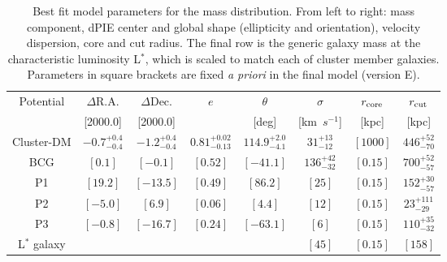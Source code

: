 \documentclass[12pt,dvipsnames]{article}
\begin{document}
\begin{table}[]
    \centering
    \begin{tabular}{c|c|c|c|c|c|c|c|}
    Potential & $\Delta$R.A. & $\Delta$Dec. & $e$ & $\theta$ & $\sigma$ & $r_{\rm core}$ & $r_{\rm cut}$ \\
    & [2000.0] & [2000.0] & & [deg] & [km\ $s^{-1}$] & [kpc] & [kpc] \\
\hline
Cluster-DM & $ -0.7^{+  0.4}_{ -0.4}$ & $ -1.2^{+  0.4}_{ -0.4}$ & $ 0.81^{+ 0.02}_{-0.13}$ & $114.9^{+  2.0}_{ -4.1}$ & $31^{+13}_{-12}$ & $[1000]$ & $446^{+52}_{-70}$ \\
BCG            & $[  0.1]$ & $[ -0.1]$ & $[0.52]$ & $[-41.1]$ & $136^{+42}_{-32}$ & $[0.15]$ & $700^{+52}_{-57}$ \\
P1             & $[ 19.2]$ & $[-13.5]$ & $[0.49]$ & $[ 86.2]$ & $[25]$            & $[0.15]$ & $152^{+30}_{-57}$ \\
P2             & $[ -5.0]$ & $[  6.9]$ & $[0.06]$ & $[  4.4]$ & $[12]$            & $[0.15]$ & $23^{+111}_{-29}$ \\
P3             & $[ -0.8]$ & $[-16.7]$ & $[0.24]$ & $[-63.1]$ & $[6]$             & $[0.15]$ & $110^{+35}_{-32}$ \\
L$^{*}$ galaxy &           &           &          &           & $[45]$            & $[0.15]$ & $[158]$\\            
\hline
    \end{tabular}
    \caption{Best fit model parameters for the mass distribution. From left to right: mass component, dPIE center and global shape (ellipticity and orientation), velocity dispersion, core and cut radius. The final row 
    is the generic galaxy mass at the characteristic luminosity L$^*$, which is scaled to match each of cluster member galaxies.  Parameters in square brackets are fixed {\it a priori} in the final model (version E). }
    \label{tab:massmodel}
\end{table}
\end{document}
